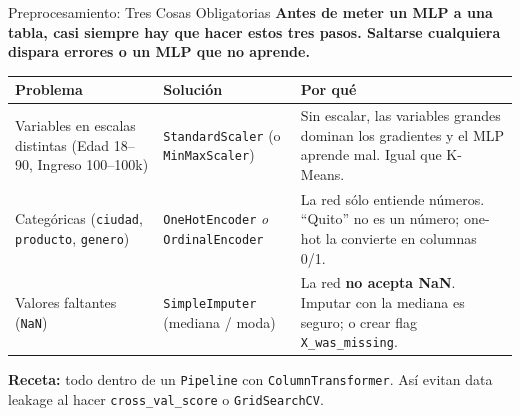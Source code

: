\documentclass[aspectratio=169, 11pt]{beamer}
\begin{document}
\begin{frame}{Preprocesamiento: Tres Cosas Obligatorias}
  \vspace{-4pt}
  {\footnotesize\color{arcaDark}\bfseries
    Antes de meter un MLP a una tabla, casi siempre hay que hacer estos
    tres pasos. Saltarse cualquiera dispara errores o un MLP que no aprende.}

  \vspace{6pt}
  {\scriptsize
  \begin{tabular}{@{}p{2.6cm} p{4.5cm} p{5.4cm}@{}}
    \toprule
    \textbf{Problema} & \textbf{Soluci\'on} & \textbf{Por qu\'e} \\
    \midrule
    \rowcolor{arcaGray}
    Variables en escalas distintas (Edad 18--90, Ingreso 100--100k)
    & \texttt{StandardScaler} (o \texttt{MinMaxScaler})
    & Sin escalar, las variables grandes dominan los gradientes y
      el MLP aprende mal. Igual que K-Means. \\
    Categ\'oricas (\texttt{ciudad}, \texttt{producto}, \texttt{genero})
    & \texttt{OneHotEncoder} \emph{o} \texttt{OrdinalEncoder}
    & La red s\'olo entiende n\'umeros. ``Quito'' no es un n\'umero;
      one-hot la convierte en columnas 0/1. \\
    \rowcolor{arcaGray}
    Valores faltantes (\texttt{NaN})
    & \texttt{SimpleImputer} (mediana / moda)
    & La red \textbf{no acepta NaN}. Imputar con la mediana es seguro;
      o crear flag \texttt{X\_was\_missing}. \\
    \bottomrule
  \end{tabular}
  }

  \vspace{6pt}
  \begin{tcolorbox}[colback=arcaGray, colframe=arcaRed, boxrule=0.5pt,
    arc=2pt, left=6pt, right=6pt, top=4pt, bottom=4pt]
    {\scriptsize\color{arcaDark}
    \faKey\hspace{4pt}\textbf{Receta:} todo dentro de un \texttt{Pipeline}
    con \texttt{ColumnTransformer}. As\'i evitan data leakage al hacer
    \texttt{cross\_val\_score} o \texttt{GridSearchCV}.}
  \end{tcolorbox}
\end{frame}
\end{document}
